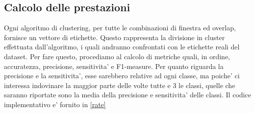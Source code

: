 \subsection{Calcolo delle prestazioni}
Ogni algoritmo di clustering, per tutte le combinazioni di finestra ed overlap, fornisce un vettore di etichette. Questo rappresenta la divisione in cluster effettuata dall'algoritmo, i quali andranno confrontati con le etichette reali del dataset. Per fare questo, procediamo al calcolo di metriche quali, in ordine, accuratezza, precisione, sensitivita' e F1-measure. Per quanto riguarda la precisione e la sensitivita', esse sarebbero relative ad ogni classe, ma poiche' ci interessa indovinare la maggior parte delle volte tutte e 3 le classi, quelle che saranno riportate sono la media della precisione e sensitivita' delle classi. Il codice implementativo e' fornito in \ref{rate}

